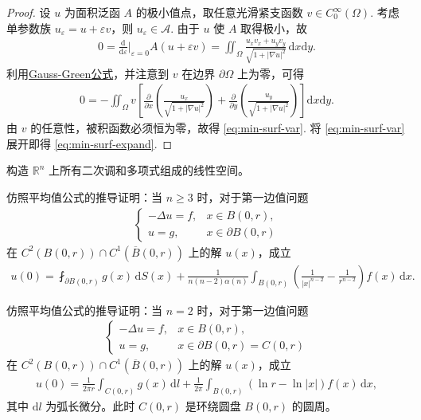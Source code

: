\documentclass[../../main.tex]{subfiles}%
\begin{document}
\begin{proof}
设 $u$ 为面积泛函 $A$ 的极小值点，取任意光滑紧支函数 $v\in C_0^\infty(\Omega)$. 考虑单参数族 $u_\varepsilon=u+\varepsilon v$，则 $u_\varepsilon\in\mathcal A$. 由于 $u$ 使 $A$ 取得极小，故
\begin{align*}
0=\frac{\mathrm{d}}{\mathrm{d}\varepsilon}\bigg|_{\varepsilon=0}A(u+\varepsilon v)
=\iint_\Omega \frac{u_x v_x+u_y v_y}{\sqrt{1+|\nabla u|^2}}\,\mathrm{d}x\mathrm{d}y.
\end{align*}
利用\hyperref[Basis of Analytics-theorem:Gauss-Green公式(散度定理)]{Gauss-Green公式}，并注意到 $v$ 在边界 $\partial\Omega$ 上为零，可得
\begin{align*}
0=-\iint_\Omega v\left[
\frac{\partial}{\partial x}\left(\frac{u_x}{\sqrt{1+|\nabla u|^2}}\right)
+\frac{\partial}{\partial y}\left(\frac{u_y}{\sqrt{1+|\nabla u|^2}}\right)
\right]\mathrm{d}x\mathrm{d}y.
\end{align*}
由 $v$ 的任意性，被积函数必须恒为零，故得 \eqref{eq:min-surf-var}. 将 \eqref{eq:min-surf-var} 展开即得 \eqref{eq:min-surf-expand}.
\end{proof}

\begin{example}
构造 $\mathbb{R}^n$ 上所有二次调和多项式组成的线性空间。
\end{example}

\begin{example}
仿照平均值公式的推导证明：当 $n\geqslant 3$ 时，对于第一边值问题
\begin{align*}
\begin{cases}
-\Delta u = f, & x\in B(0,r), \\
u = g, & x\in\partial B(0,r)
\end{cases}
\end{align*}
在 $C^2(B(0,r))\cap C^1(\overline{B}(0,r))$ 上的解 $u(x)$，成立
\begin{align*}
u(0) = \fint_{\partial B(0,r)} g(x)\,\mathrm{d}S(x) + \frac{1}{n(n-2)\alpha(n)} \int_{B(0,r)} \left( \frac{1}{|x|^{n-2}} - \frac{1}{r^{n-2}} \right) f(x)\,\mathrm{d}x.
\end{align*}
\end{example}

\begin{example}
仿照平均值公式的推导证明：当 $n=2$ 时，对于第一边值问题
\begin{align*}
\begin{cases}
-\Delta u = f, & x\in B(0,r), \\
u = g, & x\in\partial B(0,r)=C(0,r)
\end{cases}
\end{align*}
在 $C^2(B(0,r))\cap C^1(\overline{B}(0,r))$ 上的解 $u(x)$，成立
\begin{align*}
u(0) = \frac{1}{2\pi r}\int_{C(0,r)} g(x)\,\mathrm{d}l + \frac{1}{2\pi}\int_{B(0,r)} (\ln r - \ln |x|) f(x)\,\mathrm{d}x,
\end{align*}
其中 $\mathrm{d}l$ 为弧长微分。此时 $C(0,r)$ 是环绕圆盘 $B(0,r)$ 的圆周。
\end{example}
\end{document}
